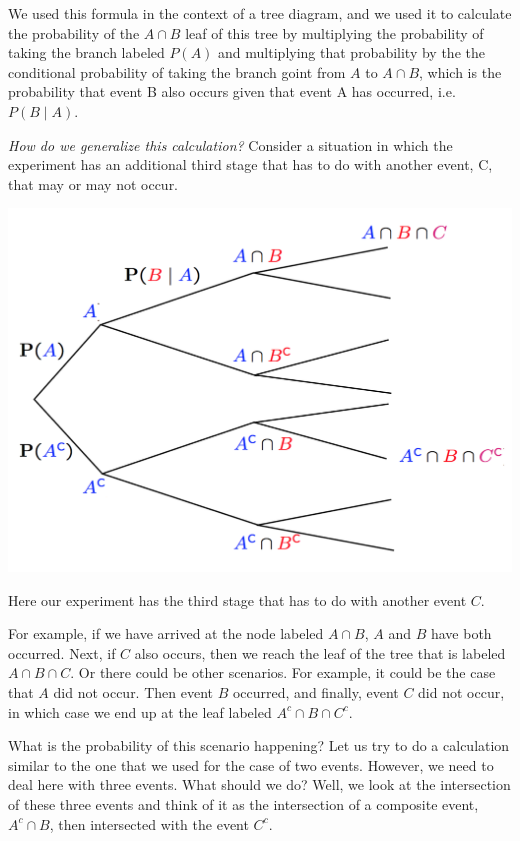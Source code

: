 \documentclass{tufte-handout}
\begin{document}
We used this formula in the context of a tree diagram, and we used it to calculate the probability of the
$A \cap B$ leaf of 
this tree by multiplying the probability of taking the
branch labeled $P(A)$ and multiplying that probability by the the conditional probability of taking the branch
goint from $A$ to $A\cap B$, which is the
probability that event B also occurs given that event A has occurred, i.e. $P(B \mid A)$.

\vspace{0.2cm}
\textit{How do we generalize this calculation?} Consider a situation in which the experiment has an additional
third stage that has to do with another event, C, that may or may not occur.

\pagebreak
\begin{marginfigure}
  \includegraphics{GeneralizedTree}
  \caption{Here our experiment has the third stage that has to do with another event $C$.}
\end{marginfigure}


For example, if we have arrived at the node labeled $A \cap B$, $A$ and $B$ have both occurred. Next, if $C$ also occurs, then we
reach the leaf of the tree that is labeled $A \cap B \cap C$. Or there could be other scenarios. For example, it could be the
case that $A$ did not occur. Then event $B$ occurred, and finally, event $C$ did not occur, in which case we
end up at the leaf labeled $A^c \cap B \cap C^c$.

What is the probability of this scenario happening? Let us try to do a calculation similar to the one that
we used for the case of two events. However, we need to deal here with three events. What should we
do? Well, we look at the intersection of these three events and think of it as the intersection of a
composite event, $A^c \cap B$, then intersected with the event $C^c$. 
\end{document}
